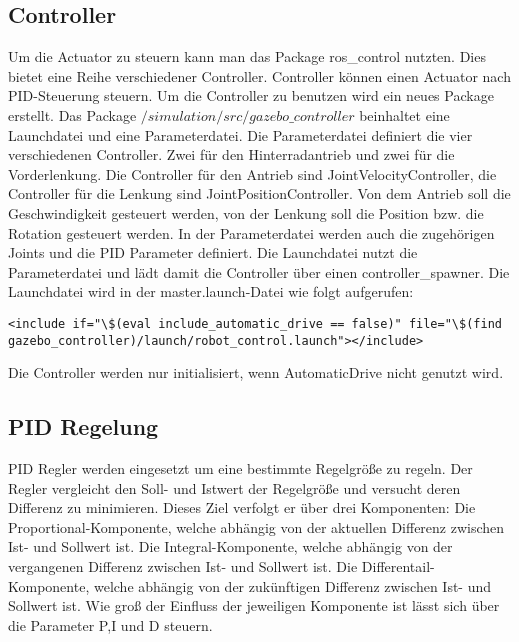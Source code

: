 \subsection*{Controller}
Um die Actuator zu steuern kann man das Package ros\_control nutzten.
Dies bietet eine Reihe verschiedener Controller.
Controller können einen Actuator nach PID-Steuerung steuern.
Um die Controller zu benutzen wird ein neues Package erstellt.
Das Package $/simulation/src/gazebo\_controller$ beinhaltet eine Launchdatei und eine Parameterdatei.
Die Parameterdatei definiert die vier verschiedenen Controller.
Zwei für den Hinterradantrieb und zwei für die Vorderlenkung.
Die Controller für den Antrieb sind JointVelocityController, die Controller für die Lenkung sind JointPositionController.
Von dem Antrieb soll die Geschwindigkeit gesteuert werden, von der Lenkung soll die Position bzw. die Rotation gesteuert werden.
In der Parameterdatei werden auch die zugehörigen Joints und die PID Parameter definiert.
Die Launchdatei nutzt die Parameterdatei und lädt damit die Controller über einen controller\_spawner.
Die Launchdatei wird in der master.launch-Datei wie folgt aufgerufen:
\begin{lstlisting}
<include if="\$(eval include_automatic_drive == false)" file="\$(find gazebo_controller)/launch/robot_control.launch"></include>
\end{lstlisting}
Die Controller werden nur initialisiert, wenn AutomaticDrive nicht genutzt wird.

\subsection{PID Regelung}
PID Regler werden eingesetzt um eine bestimmte Regelgröße zu regeln. 
Der Regler vergleicht den Soll- und Istwert der Regelgröße und versucht deren Differenz zu minimieren.
Dieses Ziel verfolgt er über drei Komponenten: 
Die Proportional-Komponente, welche abhängig von der aktuellen Differenz zwischen Ist- und Sollwert ist.
Die Integral-Komponente, welche abhängig von der vergangenen Differenz zwischen Ist- und Sollwert ist.
Die Differentail-Komponente, welche abhängig von der zukünftigen Differenz zwischen Ist- und Sollwert ist.
Wie groß der Einfluss der jeweiligen Komponente ist lässt sich über die Parameter P,I und D steuern.
\cite{PIDRegler:2020}

